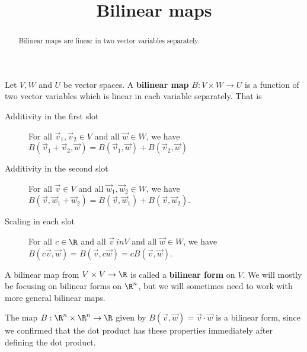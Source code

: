 \documentclass{ximera}
\title{Bilinear maps}
\begin{document}
\begin{abstract}
  Bilinear maps are linear in two vector variables separately.
\end{abstract}\maketitle	

\begin{definition}
  Let $V,W$ and $U$ be vector spaces.  A \textbf{bilinear map} $B: V \times W \to U$ is a function of two vector variables which is linear in each variable separately. 
  That is
  \begin{description}
  \item[Additivity in the first slot] For all $\vec{v}_1,\vec{v}_2 \in V$ and 
    all $\vec{w} \in W$, we have $B(\vec{v}_1+\vec{v}_2,\vec{w}) = B(\vec{v}_1,\vec{w})+B(\vec{v}_2,\vec{w})$
    
  \item[Additivity in the second slot] For all $\vec{v} \in V$ and all
    $\vec{w}_1,\vec{w}_2 \in W$, we have $B(\vec{v},\vec{w}_1+\vec{w}_2) = B(\vec{v},\vec{w}_1)+B(\vec{v},\vec{w}_2)$.
    
  \item[Scaling in each slot] For all $c \in \R$ and all $\vec{v} \ in V$ and all
    $\vec{w} \in W$, we have $B(c\vec{v},\vec{w}) = B(\vec{v},c\vec{w}) = cB(\vec{v},\vec{w})$.
  \end{description}
\end{definition}
	
A bilinear map from $V \times V \to \R$ is called a \textbf{bilinear
  form} on $V$.  We will mostly be focusing on bilinear forms on
$\R^n$, but we will sometimes need to work with more general bilinear
maps.

\begin{example}	
The map $B:\R^n \times \R^n \to \R$ given by $B(\vec{v},\vec{w}) = \vec{v} \cdot \vec{w}$ is a bilinear form, since we confirmed that
the dot product has these properties immediately after defining the dot product.
\end{example}
\end{document}
